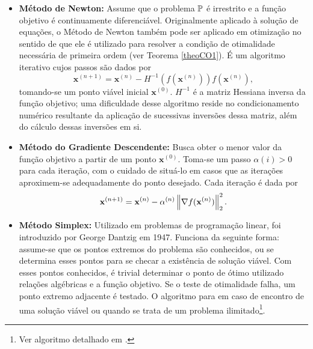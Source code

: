 \begin{itemize}
\item \textbf{M\'{e}todo de Newton:} Assume que o problema $\mathbb{P}$ \'{e} irrestrito e a fun\c{c}\~{a}o objetivo \'{e} continuamente diferenci\'{a}vel. Originalmente aplicado \`{a} solu\c{c}\~{a}o de equa\c{c}\~{o}es, o M\'{e}todo de Newton tamb\'{e}m pode ser aplicado em otimiza\c{c}\~{a}o no sentido de que ele \'{e} utilizado para resolver a condi\c{c}\~{a}o de otimalidade necess\'{a}ria de primeira ordem (ver Teorema \ref{theoCO1}). \'{E} um algoritmo iterativo cujos passos s\~{a}o dados por
\begin{equation}
\mathbf{x}^{(n+1)} = \mathbf{x}^{(n)} - H^{-1}(f(\mathbf{x}^{(n)}))f(\mathbf{x}^{(n)}),
\end{equation}
tomando-se um ponto vi\'{a}vel inicial $\mathbf{x}^{(0)}$. $H^{-1}$ \'{e} a matriz Hessiana inversa da fun\c{c}\~{a}o objetivo; uma dificuldade desse algoritmo reside no condicionamento num\'{e}rico resultante da aplica\c{c}\~{a}o de sucessivas invers\~{o}es dessa matriz, al\'{e}m do c\'{a}lculo dessas invers\~{o}es em si.

\item \textbf{M\'{e}todo do Gradiente Descendente:} Busca obter o menor valor da fun\c{c}\~{a}o objetivo a partir de um ponto $\mathbf{x}^{(0)}$. Toma-se um passo $\alpha{(i)} > 0$ para cada itera\c{c}\~{a}o, com o cuidado de situ\'{a}-lo em casos que as itera\c{c}\~{o}es aproximem-se adequadamente do ponto desejado. Cada itera\c{c}\~{a}o \'{e} dada por
\begin{equation*}
\mathbf{x}^{(n+1)} = \mathbf{x}^{(n)} - \alpha^{(n)}\left\lVert\nabla f(\mathbf{x}^{(n)})\right\rVert_{2}^{2}.
\end{equation*}

\item \textbf{M\'{e}todo Simplex:} Utilizado em problemas de programa\c{c}\~{a}o linear, foi introduzido por George Dantzig em 1947. Funciona da seguinte forma: assume-se que os pontos extremos do problema s\~{a}o conhecidos, ou se determina esses pontos para se checar a exist\^{e}ncia de solu\c{c}\~{a}o vi\'{a}vel. Com esses pontos conhecidos, \'{e} trivial determinar o ponto de \'{o}timo utilizado rela\c{c}\~{o}es alg\'{e}bricas e a fun\c{c}\~{a}o objetivo. Se o teste de otimalidade falha, um ponto extremo adjacente \'{e} testado. O algoritmo para em caso de encontro de uma solu\c{c}\~{a}o vi\'{a}vel ou quando se trata de um problema ilimitado\footnote{Ver algoritmo detalhado em \cite[pp. 70--75]{yang}.}.


\end{itemize}

